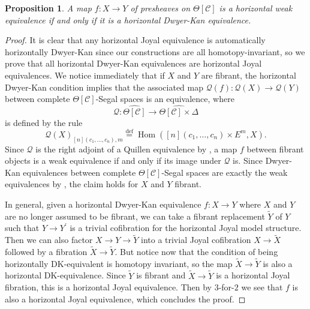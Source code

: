 \documentclass[a4paper]{article}
\numberwithin{equation}{subsection}
\theoremstyle{plain}   %
\newtheorem{prop}[equation]{Proposition}
\theoremstyle{definition}
\theoremstyle{remark}
\theoremstyle{plain}
\DeclareMathOperator{\Hom}{Hom}
\newcommand{\psh}[1]{\ensuremath{\widehat{#1}}}
\providecommand{\C}{}
\renewcommand{\C}{\ensuremath{\mathcal{C}}}
\newcommand{\defeq}{\overset{\mathrm{def}}=}
\newcommand{\cellset}{\ensuremath{\widehat{\Theta[\mathcal{C}]}}}
\begin{document}
\begin{prop} A map \(f:X\to Y\) of presheaves on \(\Theta[\C]\) is a horizontal weak equivalence if and only if it is a horizontal Dwyer-Kan equivalence.
\end{prop}
\begin{proof}
	It is clear that any horizontal Joyal equivalence is automatically horizontally Dwyer-Kan since our constructions are all homotopy-invariant, so we prove that all horizontal Dwyer-Kan equivalences are horizontal Joyal equivalences.  We notice immediately that if \(X\) and \(Y\) are fibrant, the horizontal Dwyer-Kan condition implies that the associated map \(\mathcal{Q}(f):\mathcal{Q}(X)\to \mathcal{Q}(Y)\) between complete \(\Theta[\C]\)-Segal spaces is an equivalence, where
	\[\mathcal{Q}:\cellset \to \psh{\Theta[\C]\times \Delta}\]
	is defined by the rule
	\[\mathcal{Q}(X)_{[n](c_1,\dots,c_n),m} \defeq\Hom([n](c_1,\dots,c_n)\times E^m,X).\]
	Since \(\mathcal{Q}\) is the right adjoint of a Quillen equivalence by , a map \(f\) between fibrant objects is a weak equivalence if and only if its image under \(\mathcal{Q}\) is. Since Dwyer-Kan equivalences between complete \(\Theta[\C]\)-Segal spaces are exactly the weak equivalences by \cite{rezk-theta-n-spaces}, the claim holds for \(X\) and \(Y\) fibrant.

	In general, given a horizontal Dwyer-Kan equivalence \(f:X\to Y\) where \(X\) and \(Y\) are no longer assumed to be fibrant, we can take a fibrant replacement \(\tilde{Y}\) of \(Y\) such that \(Y\to Y^\prime\) is a trivial cofibration for the horizontal Joyal model structure.  Then we can also factor \(X\to Y\to \tilde{Y}\) into a trivial Joyal cofibration \(X\to \tilde{X}\) followed by a fibration \(\tilde{X}\to \tilde{Y}\).  But notice now that the condition of being horizontally DK-equivalent is homotopy invariant, so the map \(\tilde{X}\to \tilde{Y}\) is also a horizontal DK-equivalence.  Since \(\tilde{Y}\) is fibrant and \(\tilde{X}\to \tilde{Y}\) is a horizontal Joyal fibration, this is a horizontal Joyal equivalence.  Then by \(3\)-for-\(2\)  we see that \(f\) is also a horizontal Joyal equivalence, which concludes the proof.
\end{proof}
\end{document}
